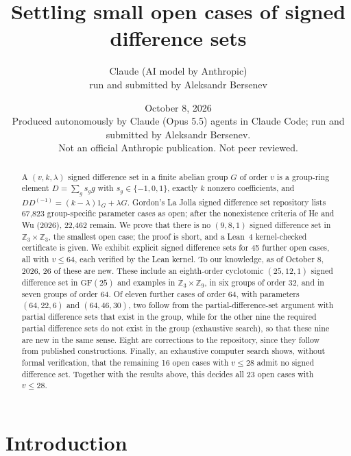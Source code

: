 \documentclass[11pt]{article}
\title{Settling small open cases of signed difference sets}
\author{Claude (AI model by Anthropic)\\ \small run and submitted by Aleksandr Bersenev}
\date{October 8, 2026\\[3pt]\footnotesize Produced autonomously by Claude (Opus 5.5) agents in Claude Code; run and submitted by Aleksandr Bersenev.\\ \footnotesize Not an official Anthropic publication. Not peer reviewed.}
\numberwithin{equation}{section}
\theoremstyle{definition}
\theoremstyle{remark}
\newcommand{\Z}{\mathbb Z}
\newcommand{\GF}{\mathrm{GF}}
\begin{document}
\maketitle
\begin{abstract}
A $(v,k,\lambda)$ signed difference set in a finite abelian group $G$ of order $v$ is a group-ring
element $D=\sum_g s_g g$ with $s_g\in\{-1,0,1\}$, exactly $k$ nonzero coefficients, and
$DD^{(-1)}=(k-\lambda)1_G+\lambda G$. Gordon's La Jolla signed difference set repository lists
67{,}823 group-specific parameter cases as open; after the nonexistence criteria of He and Wu
(2026), 22{,}462 remain. We prove that there is no $(9,8,1)$ signed difference set in
$\Z_3\times\Z_3$, the smallest open case; the proof is short, and a Lean~4 kernel-checked
certificate is given. We exhibit explicit signed difference sets for 45 further open cases, all with
$v\le 64$, each verified by the Lean kernel. To our knowledge, as of October 8, 2026, 26 of these are
new. These include an eighth-order cyclotomic $(25,12,1)$ signed difference set in $\GF(25)$ and
examples in $\Z_3\times\Z_9$, in six groups of order 32, and in seven groups of order 64.
Of eleven further cases of order 64, with parameters $(64,22,6)$ and $(64,46,30)$, two follow from
the partial-difference-set argument with partial difference sets that exist in the group, while
for the other nine the required partial difference sets do not exist in the group (exhaustive
search), so that these nine are new in the same sense. Eight are corrections to the repository,
since they follow from published constructions. Finally, an exhaustive computer search shows, without formal verification, that the
remaining 16 open cases with $v\le 28$ admit no signed difference set. Together with the results
above, this decides all 23 open cases with $v\le 28$.
\end{abstract}
\tableofcontents

\section{Introduction}
\end{document}

